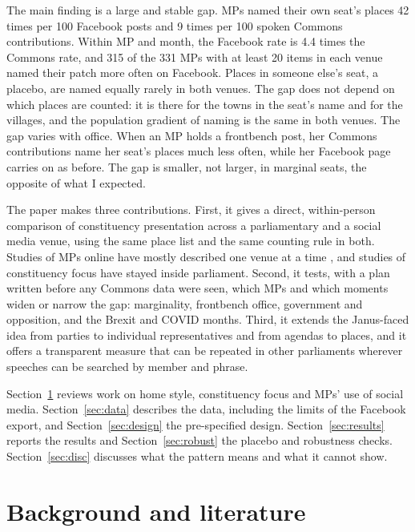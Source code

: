 \documentclass[11pt,a4paper]{article}
\begin{document}
The main finding is a large and stable gap. MPs named their own seat's places 42 times per 100 Facebook posts and 9 times per 100 spoken Commons contributions. Within MP and month, the Facebook rate is 4.4 times the Commons rate, and 315 of the 331 MPs with at least 20 items in each venue named their patch more often on Facebook. Places in someone else's seat, a placebo, are named equally rarely in both venues. The gap does not depend on which places are counted: it is there for the towns in the seat's name and for the villages, and the population gradient of naming is the same in both venues. The gap varies with office. When an MP holds a frontbench post, her Commons contributions name her seat's places much less often, while her Facebook page carries on as before. The gap is smaller, not larger, in marginal seats, the opposite of what I expected.

The paper makes three contributions. First, it gives a direct, within-person comparison of constituency presentation across a parliamentary and a social media venue, using the same place list and the same counting rule in both. Studies of MPs online have mostly described one venue at a time \citep{jackson2011,southern2019}, and studies of constituency focus have stayed inside parliament. Second, it tests, with a plan written before any Commons data were seen, which MPs and which moments widen or narrow the gap: marginality, frontbench office, government and opposition, and the Brexit and COVID months. Third, it extends the Janus-faced idea from parties to individual representatives and from agendas to places, and it offers a transparent measure that can be repeated in other parliaments wherever speeches can be searched by member and phrase.

Section~\ref{sec:lit} reviews work on home style, constituency focus and MPs' use of social media. Section~\ref{sec:data} describes the data, including the limits of the Facebook export, and Section~\ref{sec:design} the pre-specified design. Section~\ref{sec:results} reports the results and Section~\ref{sec:robust} the placebo and robustness checks. Section~\ref{sec:disc} discusses what the pattern means and what it cannot show.

\section{Background and literature}\label{sec:lit}
\end{document}
